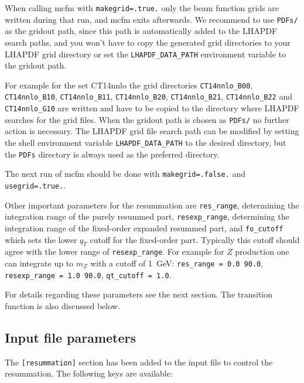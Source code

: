 \documentclass[
  11pt]{scrartcl}
\begin{document}
When calling mcfm with \texttt{makegrid=.true.} only the beam function
grids are written during that run, and mcfm exits afterwards.
We recommend to use \texttt{PDFs/} as the gridout path, since this
path is automatically added to the LHAPDF search paths, and you won't have to
copy the generated grid directories to your LHAPDF grid directory or set the
\texttt{LHAPDF\_DATA\_PATH} environment variable to the gridout path.

For example for the set CT14nnlo the grid directories
\texttt{CT14nnlo\_B00}, \texttt{CT14nnlo\_B10}, \texttt{CT14nnlo\_B11},
\texttt{CT14nnlo\_B20}, \texttt{CT14nnlo\_B21}, \texttt{CT14nnlo\_B22} and \texttt{CT14nnlo\_G10} are written and have to be copied to the
directory where LHAPDF searches for the grid files. When the gridout path is chosen as \texttt{PDFs/} no further action is necessary. The LHAPDF grid file
search path can be modified by setting the shell
environment variable \texttt{LHAPDF\_DATA\_PATH} to the desired
directory, but the \texttt{PDFs} directory is always used as the preferred directory.


The next run of mcfm should be done with \texttt{makegrid=.false.} and
\texttt{usegrid=.true.}.

Other important parameters for the resummation are \texttt{res\_range},
determining the integration range of the purely resummed part,
\texttt{resexp\_range}, determining the integration range of the
fixed-order expanded resummed part, and \texttt{fo\_cutoff} which sets
the lower \(q_T\) cutoff for the fixed-order part. Typically this cutoff
should agree with the lower range of \texttt{resexp\_range}. For example
for \(Z\) production one can integrate up to \(m_Z\) with a cutoff of
\SI{1}{\GeV}: \texttt{res\_range = 0.0 90.0},
\texttt{resexp\_range = 1.0 90.0}, \texttt{qt\_cutoff = 1.0}.

For details regarding these parameters see the next section. The
transition function is also discussed below.

\hypertarget{input-file-parameters}{%
\subsection{Input file parameters}\label{input-file-parameters}}

The \texttt{[resummation]} section has been added to the input file to
control the resummation. The following keys are available:
\end{document}
